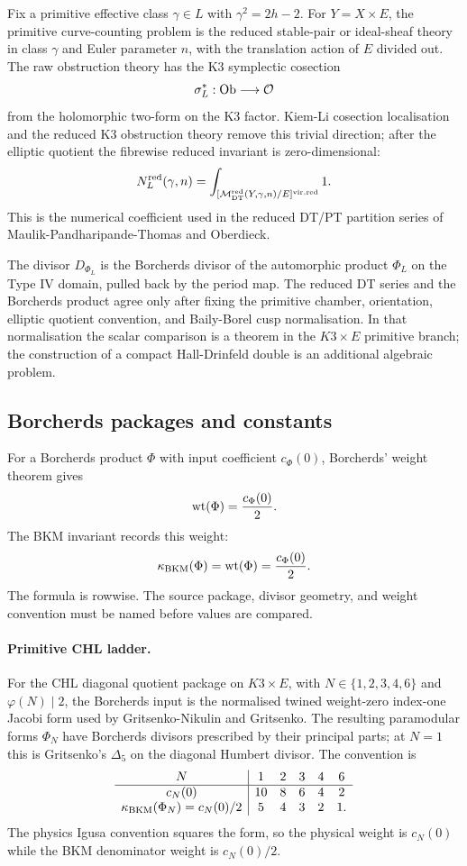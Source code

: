 Fix a primitive effective class $\gamma\in L$ with
$\gamma^2=2h-2$.  For $Y=X\times E$, the primitive curve-counting
problem is the reduced stable-pair or ideal-sheaf theory in class
$\gamma$ and Euler parameter $n$, with the translation action of $E$
divided out.  The raw obstruction theory has the K3 symplectic
cosection
\[
  \sigma_L^*:\mathrm{Ob}\longrightarrow\mathcal{O}
\]
from the holomorphic two-form on the K3 factor.  Kiem-Li cosection
localisation and the reduced K3 obstruction theory remove this trivial
direction; after the elliptic quotient the fibrewise reduced invariant is
zero-dimensional:
\[
  N_L^{\mathrm{red}}(\gamma,n)
  =
  \int_{
    [\mathcal{M}^{\mathrm{red}}_{\mathrm{DT}}(Y,\gamma,n)/E]^{\mathrm{vir,red}}
  }1 .
\]
This is the numerical coefficient used in the reduced DT/PT partition
series of Maulik-Pandharipande-Thomas and Oberdieck.

The divisor $D_{\Phi_L}$ is the Borcherds divisor of the automorphic
product $\Phi_L$ on the Type IV domain, pulled back by the period map.
The reduced DT series and the Borcherds product agree only after fixing
the primitive chamber, orientation, elliptic quotient convention, and
Baily-Borel cusp normalisation.  In that normalisation the scalar
comparison is a theorem in the $K3\times E$ primitive branch; the
construction of a compact Hall-Drinfeld double is an additional algebraic
problem.

\subsection*{Borcherds packages and constants}

For a Borcherds product $\Phi$ with input coefficient $c_\Phi(0)$,
Borcherds' weight theorem gives
\[
  \mathrm{wt}(\Phi)=\frac{c_\Phi(0)}{2}.
\]
The BKM invariant records this weight:
\[
  \kappa_{\mathrm{BKM}}(\Phi)=\mathrm{wt}(\Phi)=\frac{c_\Phi(0)}{2}.
\]
The formula is rowwise.  The source package, divisor geometry, and
weight convention must be named before values are compared.

\paragraph{Primitive CHL ladder.}
For the CHL diagonal quotient package on $K3\times E$, with
$N\in\{1,2,3,4,6\}$ and $\varphi(N)\mid 2$, the Borcherds input is the
normalised twined weight-zero index-one Jacobi form used by
Gritsenko-Nikulin and Gritsenko.  The resulting paramodular forms
$\Phi_N$ have Borcherds divisors prescribed by their principal parts;
at $N=1$ this is Gritsenko's $\Delta_5$ on the diagonal Humbert
divisor.  The convention is
\[
\begin{array}{c|ccccc}
N & 1 & 2 & 3 & 4 & 6\\ \hline
c_N(0) & 10 & 8 & 6 & 4 & 2\\
\kappa_{\mathrm{BKM}}(\Phi_N)=c_N(0)/2 & 5 & 4 & 3 & 2 & 1 .
\end{array}
\]
The physics Igusa convention squares the form, so the physical weight is
$c_N(0)$ while the BKM denominator weight is $c_N(0)/2$.

